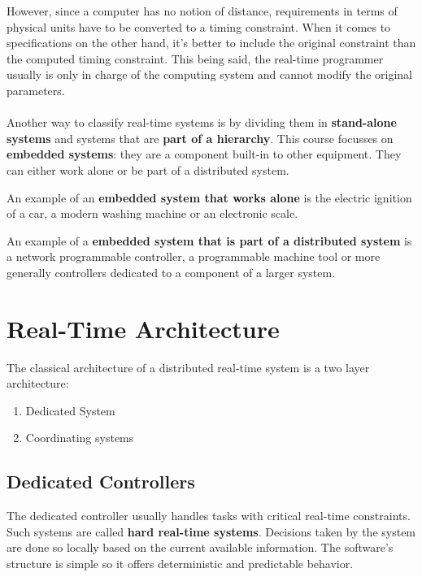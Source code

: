 \documentclass[../main.tex]{subfiles}
\begin{document}
However, since a computer has no notion of distance, requirements in terms of physical units have to be converted to a timing constraint. When it comes to specifications on the other hand, it's better to include the original constraint than the computed timing constraint. This being said, the real-time programmer usually is only in charge of the computing system and cannot modify the original parameters.
\\\\
Another way to classify real-time systems is by dividing them in \textbf{stand-alone systems} and systems that are \textbf{part of a hierarchy}. This course focusses on \textbf{embedded systems}: they are a component built-in to other equipment. They can either work alone or be part of a distributed system.

\begin{exmp}
An example of an \textbf{embedded system that works alone} is the electric ignition of a car, a modern washing machine or an electronic scale.
\end{exmp} 

\begin{exmp}
An example of a \textbf{embedded system that is part of a distributed system} is a network programmable controller, a programmable machine tool or more generally controllers dedicated to a component of a larger system.
\end{exmp} 


\section{Real-Time Architecture}
The classical architecture of a distributed real-time system is a two layer architecture:
\begin{enumerate}
	\item Dedicated System
	\item Coordinating systems
\end{enumerate}

\subsection{Dedicated Controllers}
The dedicated controller usually handles tasks with critical real-time constraints. Such systems are called \textbf{hard real-time systems}. Decisions taken by the system are done so locally based on the current available information. The software's structure is simple so it offers deterministic and predictable behavior. 
 
\end{document}
